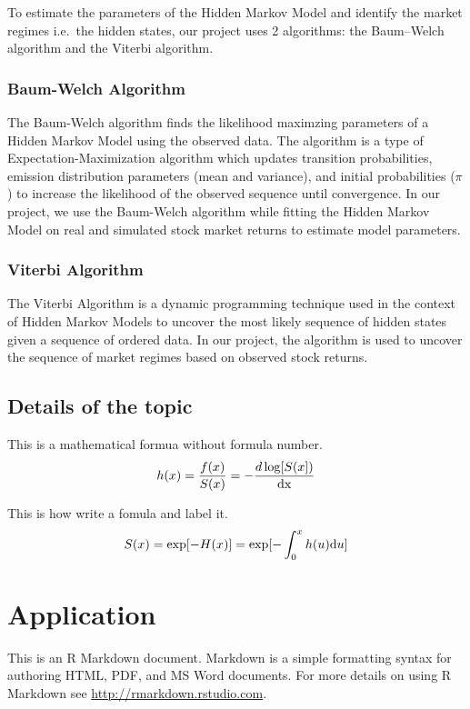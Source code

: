 \documentclass[
]{article}
\begin{document}
To estimate the parameters of the Hidden Markov Model and identify the
market regimes i.e.~the hidden states, our project uses 2 algorithms:
the Baum--Welch algorithm and the Viterbi algorithm.

\subsubsection{Baum-Welch Algorithm}\label{baum-welch-algorithm}

The Baum-Welch algorithm finds the likelihood maximzing parameters of a
Hidden Markov Model using the observed data. The algorithm is a type of
Expectation-Maximization algorithm which updates transition
probabilities, emission distribution parameters (mean and variance), and
initial probabilities (\(\pi\)) to increase the likelihood of the
observed sequence until convergence. In our project, we use the
Baum-Welch algorithm while fitting the Hidden Markov Model on real and
simulated stock market returns to estimate model parameters.

\subsubsection{Viterbi Algorithm}\label{viterbi-algorithm}

The Viterbi Algorithm is a dynamic programming technique used in the
context of Hidden Markov Models to uncover the most likely sequence of
hidden states given a sequence of ordered data. In our project, the
algorithm is used to uncover the sequence of market regimes based on
observed stock returns.

\subsection{Details of the topic}\label{details-of-the-topic}

This is a mathematical formua without formula number.
\[h(x) = \frac{f(x)}{S(x)} = -\frac{d \log[S(x])}{\rm dx}\]

This is how write a fomula and label it. \begin{align}
\label{eq2}
S(x) = \exp[-H(x)] = \exp[-\int_0^x h(u) {\rm d}u]
\end{align}

\section{Application}\label{application}

This is an R Markdown document. Markdown is a simple formatting syntax
for authoring HTML, PDF, and MS Word documents. For more details on
using R Markdown see \url{http://rmarkdown.rstudio.com}.
\end{document}
